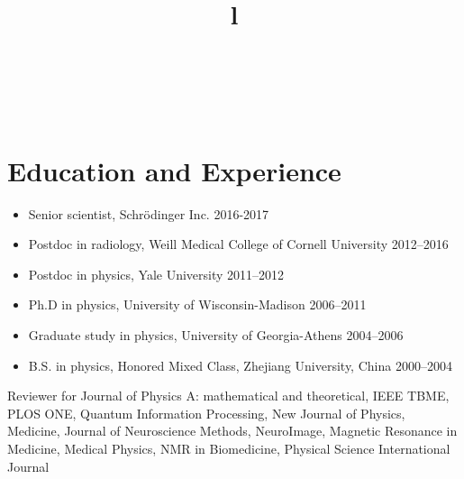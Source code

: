 \documentclass[centered,11pt,overlapped]{res}
\begin{document}
\begin{resume}
\begin{format}
\title{l}\\
\\
\end{format}


\section{\sc Education and Experience}

\begin{itemize}
\item Senior scientist, Schr\"odinger Inc. \hfill 2016-2017
\item Postdoc in radiology, Weill Medical College of Cornell University \hfill 2012--2016 
\item Postdoc in physics, Yale University \hfill 2011--2012
\item {Ph.D in physics, University of Wisconsin-Madison} 
\hfill {2006--2011} 
\item {Graduate study in physics, University of Georgia-Athens} \hfill {2004--2006}  
\item {B.S. in physics, Honored Mixed Class},  
{Zhejiang University, China } \hfill {2000--2004}  
\end{itemize}

Reviewer for Journal of Physics A: mathematical and theoretical, IEEE TBME, PLOS ONE, Quantum Information Processing, New Journal of Physics, Medicine, Journal of Neuroscience Methods, NeuroImage, Magnetic Resonance in Medicine, Medical Physics, NMR in Biomedicine, Physical Science International Journal



\end{resume}
\end{document}
